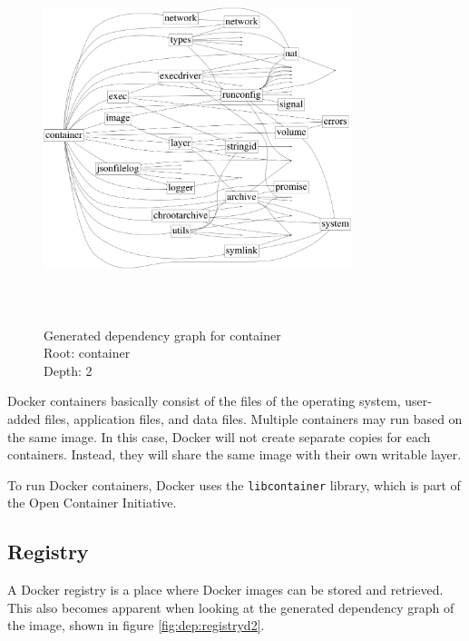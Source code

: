 \begin{figure}[H]
\caption{%
Generated dependency graph for container\\
Root: container\\
Depth: 2%
}
\centering
\includegraphics[width=0.8\textwidth, height=10cm]{images/dependencyGoviz/govizcontainerD-2-waybetter.png}
\label{fig:dep:containerd2}
\end{figure}

Docker containers basically consist of the files of the operating system,
user-added files, application files, and data files.  Multiple containers may run
based on the same image. In this case, Docker will not create separate copies for
each containers. Instead, they will share the same image with their own writable layer.

To run Docker containers, Docker uses the \verb|libcontainer| library, which is part of the Open Container Initiative.

\subsection{Registry}
\label{subsec:dockerregistry}
A Docker registry is a place where Docker images can be stored and retrieved. This also becomes apparent when looking at the generated dependency graph of the image, shown in figure  \ref{fig:dep:registryd2}.

